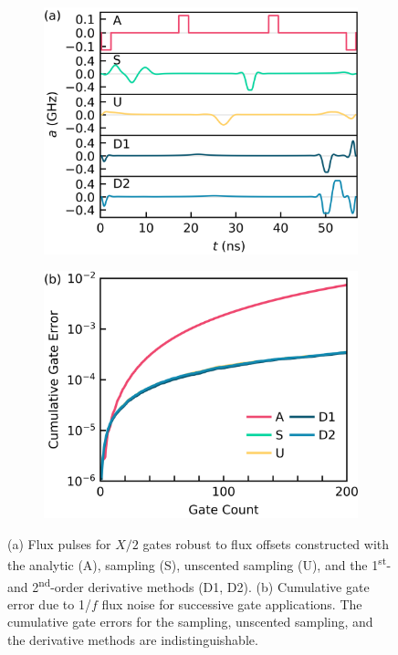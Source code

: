 \begin{figure}[ht]
  \begin{subfigure}{.4\textwidth}
    \includegraphics[width=\linewidth]{assets/f3a.png}
    \caption{}
    \label{fig:stochastica}
  \end{subfigure}\hspace{0.05\textwidth}
  \begin{subfigure}{.4\textwidth}
    \includegraphics[width=\linewidth]{assets/f3b.png}
        \caption{}
    \label{fig:stochasticb}
  \end{subfigure}
  \caption{
    (a) Flux pulses for $X/2$ gates robust to flux offsets
    constructed with the analytic (A),
    sampling (S), unscented sampling (U), and the 1\textsuperscript{st}-
    and 2\textsuperscript{nd}-order derivative methods (D1, D2).
    (b) Cumulative gate error due to 1/$f$ flux noise for
    successive gate applications. The cumulative gate errors for the
    sampling, unscented sampling, and the derivative methods are indistinguishable.
  }
  \label{fig:stochastic}
\end{figure}
